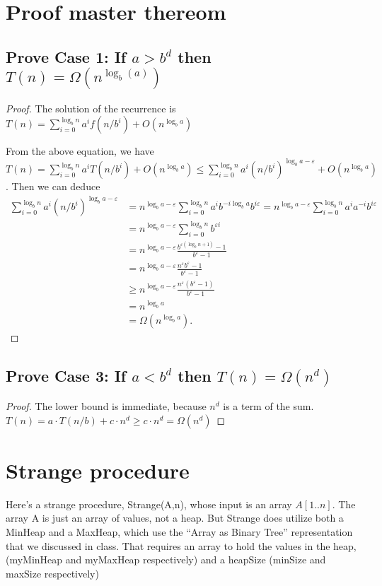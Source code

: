 \documentclass[a4paper]{article}
\begin{document}
\section{Proof master thereom}
\subsection{Prove Case 1: If $a>b^d$ then $T(n)=\Omega\left(n^{ \log _b(a)}\right)$}
\begin{proof}
  The solution of the recurrence is $T(n)=\sum_{i=0}^{\log _b n} a^i f\left(n / b^i\right)+O\left(n^{\log _b a}\right)$

  From the above equation, we have $T(n)=\sum_{i=0}^{\log _b n} a^i T\left(n / b^i\right)+O\left(n^{\log _b a}\right) \leq \sum_{i=0}^{\log _b n} a^i\left(n / b^i\right)^{\log _b a-\varepsilon}+O\left(n^{\log _b a}\right)$. Then we can deduce
$$
  \begin{aligned}
    \sum_{i=0}^{\log _b n} a^i\left(n / b^i\right)^{\log _b a-\varepsilon} &=n^{\log _b a-\varepsilon} \sum_{i=0}^{\log _b n} a^i b^{-i \log _b a} b^{i \varepsilon}=n^{\log _b a-\varepsilon} \sum_{i=0}^{\log _b n} a^i a^{-i} b^{i \varepsilon} \\
    &=n^{\log _b a-\varepsilon} \sum_{i=0}^{\log _b n} b^{\varepsilon i}
    \\ &=n^{\log _b a-\varepsilon} \frac{b^{\varepsilon\left(\log _b n+1\right)}-1}{b^{\varepsilon}-1} \\
    &=n^{\log _b a-\varepsilon} \frac{n^{\varepsilon} b^{\varepsilon}-1}{b^{\varepsilon}-1}
    \\& \geq n^{\log _b a-\varepsilon} \frac{n^{\varepsilon}( b^{\varepsilon}-1)}{b^{\varepsilon}-1}\\ 
    &=n^{\log _b a} \\
    &=\Omega\left(n^{\log _b a}\right) .
    \end{aligned}
    $$
\end{proof}
\subsection{Prove Case 3: If $a<b^d$ then $T(n)=\Omega\left(n^d\right)$}
\begin{proof}
  The lower bound is immediate, because $n^d$ is a term of the sum. $T(n)=a \cdot T(n / b)+c \cdot n^d\geq c \cdot n^d=\Omega(n^d)$
\end{proof}
\section{Strange procedure}
Here's a strange procedure, Strange(A,n), whose input is an array $A[1..n]$.
The array A is just an array of values, not a heap. But Strange does utilize both a MinHeap and a MaxHeap, which use the “Array as Binary Tree” representation that we discussed in class. That requires an array to
hold the values in the heap, (myMinHeap and myMaxHeap respectively) and a
heapSize (minSize and maxSize respectively)
\end{document}

